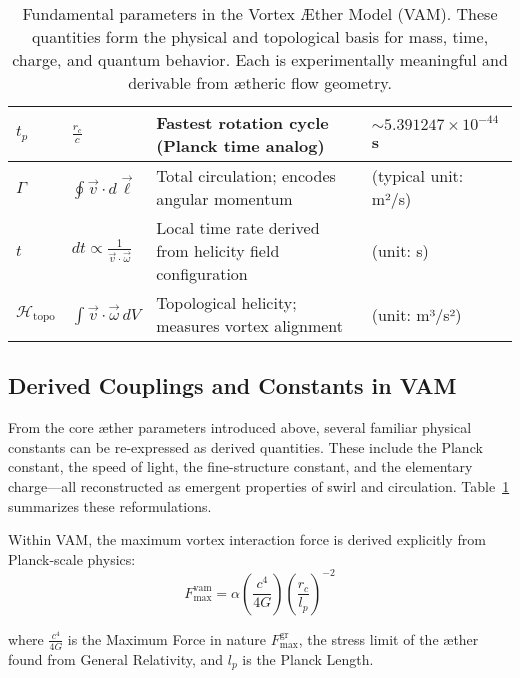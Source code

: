 \begin{table}[H]
\begin{tabular}{|l|l|l|l|}
        $t_p$ &
        $\frac{r_c}{c}$ &
        Fastest rotation cycle (Planck time analog) &
        $\sim 5.391247 \times 10^{-44}$ s \\
        \hline

        $\Gamma$ &
        $\oint \vec{v} \cdot d\vec{\ell}$ &
        Total circulation; encodes angular momentum &
        (typical unit: m²/s) \\
        \hline

        $t$ &
        $dt \propto \frac{1}{\vec{v} \cdot \vec{\omega}}$ &
        Local time rate derived from helicity field configuration &
        (unit: s) \\
        \hline

        $\mathcal{H}_\text{topo}$ &
        $\int \vec{v} \cdot \vec{\omega} \, dV$ &
        Topological helicity; measures vortex alignment &
        (unit: m³/s²) \\
        \hline
    \end{tabular}
    \caption{Fundamental parameters in the Vortex Æther Model (VAM). These quantities form the physical and topological basis for mass, time, charge, and quantum behavior. Each is experimentally meaningful and derivable from ætheric flow geometry.}
    \label{tab:VAM_master_table}
\end{table}


\subsection*{Derived Couplings and Constants in VAM}
From the core æther parameters introduced above, several familiar physical constants can be re-expressed as derived quantities. These include the Planck constant, the speed of light, the fine-structure constant, and the elementary charge—all reconstructed as emergent properties of swirl and circulation. Table~\ref{tab:VAM_master_table} summarizes these reformulations.

Within VAM, the maximum vortex interaction force is derived explicitly from Planck-scale physics:
\begin{equation}
    F^{\text{vam}}_\text{max} = \alpha \left(\frac{c^4}{4G}\right)  \left(\frac{r_c}{l_p}\right)^{-2}\label{eq:FmaxVAMfromGR}
\end{equation}

where $\frac{c^4}{4G}$ is the Maximum Force in nature $F^{\text{gr}}_\text{max}$, the stress limit of the æther found from General Relativity, and $l_p$ is the Planck Length.


